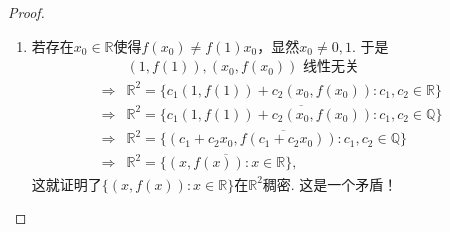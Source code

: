 \documentclass[../../main.tex]{subfiles}
\begin{document}
\begin{proof}
\begin{enumerate}
\item 若存在\(x_0\in\mathbb{R}\)使得\(f(x_0)\neq f(1)x_0\)，显然\(x_0\neq0,1\). 于是
\begin{align*}
&(1,f(1)),(x_0,f(x_0))\text{ 线性无关}\\
\Rightarrow&\mathbb{R}^2=\{c_1(1,f(1))+c_2(x_0,f(x_0)):c_1,c_2\in\mathbb{R}\}\\
\Rightarrow&\mathbb{R}^2=\overline{\{c_1(1,f(1))+c_2(x_0,f(x_0)):c_1,c_2\in\mathbb{Q}\}}\\
\Rightarrow&\mathbb{R}^2=\overline{\{(c_1 + c_2x_0,f(c_1 + c_2x_0)):c_1,c_2\in\mathbb{Q}\}}\\
\Rightarrow&\mathbb{R}^2=\overline{\{(x,f(x)):x\in\mathbb{R}\}},
\end{align*}
这就证明了\(\{(x,f(x)):x\in\mathbb{R}\}\)在\(\mathbb{R}^2\)稠密. 这是一个矛盾！
\end{enumerate}
\end{proof}
\end{document}
